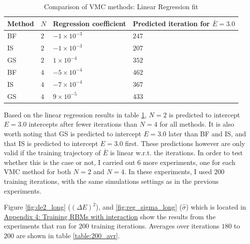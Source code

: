 \documentclass[%
oneside,                 %
final,                   %
10pt]{article}
\begin{document}
\begin{table}[H]
\begin{center}
\begin{tabular}{llll}
\hline
Method & $N$ &Regression coefficient & Predicted iteration for $\bar E=3.0$  \\
\hline
BF &$2$ &  $ -1 \times 10^{ -3 } $ & $ 247 $  \\
IS &$2$ &  $ -1 \times 10^{ -3 } $ & $ 207 $  \\
GS &$2$ &  $ 1 \times 10^{ -4 } $ & $352 $  \\
BF &$4$ &  $ -5 \times 10^{ -4 } $ & $ 462 $  \\
IS &$4$ &  $ -7 \times 10^{ -4 } $ & $ 367 $  \\
GS &$4$ &  $ 9 \times 10^{ -5 } $ & $433 $  \\
\hline
\end{tabular}
\end{center}
\caption{Comparison of VMC methods: Linear Regression fit}
\label{table:reg}
\end{table}

Based on the linear regression results in table \ref{table:reg}, $N=2$ is predicted to intercept $E=3.0$ intercepts after fewer iterations than $N=4$ for all methods. It is also worth noting that GS is predicted to intercept $E=3.0$ later than BF and IS, and that IS is predicted to intercept $E=3.0$ first. These predictions however are only valid if the training trajectory of $\bar E$ is linear w.r.t. the iterations. In order to test whether this is the case or not, I carried out $6$ more experiments, one for each VMC method for both $N=2$ and $N=4$. In these experiments, I used $200$ training iterations, with the same simulations settings as in the previous experiments. 


Figure \ref{fig:de2_long} ($(\Delta E)^2$),  and \ref{fig:reg_sigma_long} ($\hat \sigma$) which is located in \hyperref[APP_4]{Appendix 4: Training RBMs with interaction} show the results from the experiments that ran for $200$ training iterations. Averages over iterations $180$ to $200$ are shown in table \ref{table:200_avr}. 
\end{document}
